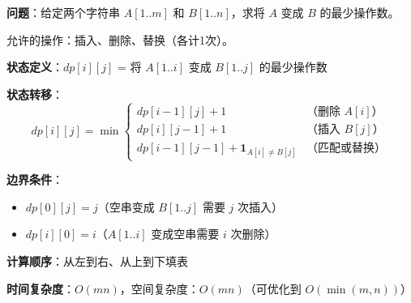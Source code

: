 \documentclass[12pt, a4paper]{ctexart}
\begin{document}
\begin{blackboard}

\textbf{问题}：给定两个字符串 $A[1..m]$ 和 $B[1..n]$，求将 $A$ 变成 $B$ 的最少操作数。

允许的操作：插入、删除、替换（各计1次）。

\textbf{状态定义}：$dp[i][j]$ = 将 $A[1..i]$ 变成 $B[1..j]$ 的最少操作数

\textbf{状态转移}：
\[
dp[i][j] = \min \begin{cases}
dp[i-1][j] + 1 & \text{（删除 $A[i]$）} \\
dp[i][j-1] + 1 & \text{（插入 $B[j]$）} \\
dp[i-1][j-1] + \mathbf{1}_{A[i] \neq B[j]} & \text{（匹配或替换）}
\end{cases}
\]

\textbf{边界条件}：
\begin{itemize}
    \item $dp[0][j] = j$（空串变成 $B[1..j]$ 需要 $j$ 次插入）
    \item $dp[i][0] = i$（$A[1..i]$ 变成空串需要 $i$ 次删除）
\end{itemize}

\textbf{计算顺序}：从左到右、从上到下填表

\textbf{时间复杂度}：$O(mn)$，空间复杂度：$O(mn)$（可优化到 $O(\min(m,n))$）

\end{blackboard}
\end{document}
